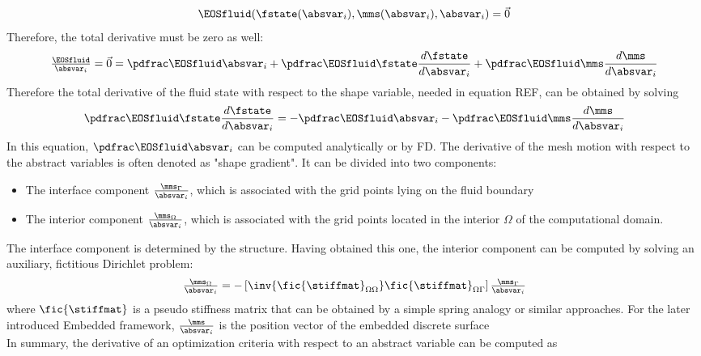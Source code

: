 \documentclass[../main.tex]{subfiles}
\begin{document}
\begin{align}
\EOSfluid(\fstate(\absvar_i),\mms(\absvar_i),\absvar_i)=\vec{0}
\end{align}
Therefore, the total derivative must be zero as well:
\begin{align}
\DEOSfluidBYabsvarI=\vec{0}=
\PEOSfluidBYabsvarI+
\PEOSfluidBYfstate\DfstateBYabsvarI+
\PEOSfluidBYmms\DmmsBYabsvarI
\end{align}
Therefore the total derivative of the fluid state with respect to the shape variable, needed in equation REF, can be obtained by solving
\begin{align}
\PEOSfluidBYfstate\DfstateBYabsvarI= -
\PEOSfluidBYabsvarI -
\PEOSfluidBYmms\DmmsBYabsvarI
\end{align}
In this equation, $\PEOSfluidBYabsvarI$ can be computed analytically or by \ac{FD}. The derivative of the mesh motion with respect to the abstract variables is often denoted as "shape gradient". It can be divided into two components:
\begin{itemize}
\item The interface component $\tfrac{\mms_\Gamma}{\absvar_i}$, which is associated with the grid points lying on the fluid boundary
\item The interior component $\tfrac{\mms_\Omega}{\absvar_i}$, which is associated with the grid points located in the interior $\Omega$ of the computational domain.
\end{itemize}
The interface component is determined by the structure. Having obtained this one, the interior component can be computed by solving an auxiliary, fictitious Dirichlet problem:
\begin{align}
\tfrac{\mms_\Omega}{\absvar_i}=-\left[\inv{\fic{\stiffmat}_{\Omega\Omega}} \fic{\stiffmat}_{\Omega\Gamma}\right] \tfrac{\mms_\Gamma}{\absvar_i}
\end{align}
where $\fic{\stiffmat}$ is a pseudo stiffness matrix that can be obtained by a simple spring analogy or similar approaches.
For the later introduced Embedded framework, $\tfrac{\mms}{\absvar_i}$ is the position vector of the embedded discrete surface
 \\
In summary, the derivative of an optimization criteria with respect to an abstract variable can be computed as
\end{document}
